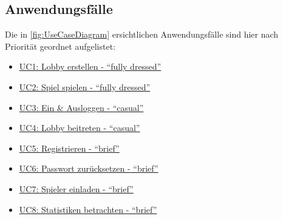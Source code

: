 \documentclass[11pt,ngerman]{article}
\newcommand{\quotes}[1]{``#1''}
\begin{document}
    \subsection{Anwendungsfälle}
    Die in \autoref{fig:UseCaseDiagram} ersichtlichen Anwendungsfälle sind hier nach Priorität geordnet aufgelistet:
    \begin{multicols}{2}
    	\begin{itemize}
    		\item  \hyperref[ssec:UC1Lobbyerstellen]{UC1: Lobby erstellen - \quotes{fully dressed}}
    		\item\hyperref[ssec:UC2Spielspielen]{UC2: Spiel spielen - \quotes{fully dressed}}
    		\item \hyperref[sssec:UC3EinAusloggen]{UC3: Ein \& Ausloggen  - \quotes{casual}}
    		\item \hyperref[sssec:UC4Lobbybeitreten]{UC4: Lobby beitreten - \quotes{casual}}
    		\item \hyperref[sssec:UC5Registrieren]{UC5: Registrieren - \quotes{brief}}
    		\item \hyperref[sssec:UC6Passwortsetzen]{UC6: Passwort zurücksetzen - \quotes{brief}}
    		\item  \hyperref[sssec:UC7Spielereinladen]{UC7: Spieler einladen - \quotes{brief}}
    		\item \hyperref[sssec:UC8Statistikenbetrachten]{UC8: Statistiken betrachten - \quotes{brief}}
    	\end{itemize}
    \end{multicols}
\end{document}
